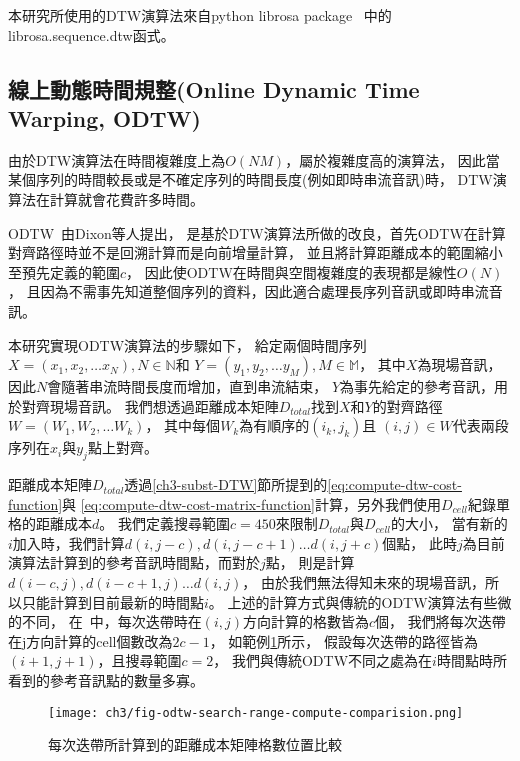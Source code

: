 \documentclass[class=NCU_thesis, crop=false]{standalone}
\begin{document}
本研究所使用的DTW演算法來自python librosa package~\cite{McFee2024librosa}
中的librosa.sequence.dtw函式。

\subsection{線上動態時間規整(Online Dynamic Time Warping, ODTW)} \label{ch3-subst-ODTW}
由於DTW演算法在時間複雜度上為$O(NM)$，屬於複雜度高的演算法，
因此當某個序列的時間較長或是不確定序列的時間長度(例如即時串流音訊)時，
DTW演算法在計算就會花費許多時間。

ODTW~\cite{dixon2005ODTW}由Dixon等人提出，
是基於DTW演算法所做的改良，首先ODTW在計算對齊路徑時並不是回溯計算而是向前增量計算，
並且將計算距離成本的範圍縮小至預先定義的範圍$c$，
因此使ODTW在時間與空間複雜度的表現都是線性$O(N)$，
且因為不需事先知道整個序列的資料，因此適合處理長序列音訊或即時串流音訊。

本研究實現ODTW演算法的步驟如下，
給定兩個時間序列
$X = (x_1, x_2, \dots x_N), N \in \mathbb{N}$和
$Y = (y_1, y_2, \dots y_M), M \in \mathbb{M}$，
其中$X$為現場音訊，因此$N$會隨著串流時間長度而增加，直到串流結束，
$Y$為事先給定的參考音訊，用於對齊現場音訊。
我們想透過距離成本矩陣$D_{total}$找到$X$和$Y$的對齊路徑$W = (W_1, W_2, \dots W_k)$，
其中每個$W_k$為有順序的$(i_k,j_k)$且
$(i,j) \in W$代表兩段序列在$x_i$與$y_j$點上對齊。

距離成本矩陣$D_{total}$透過\ref{ch3-subst-DTW}節所提到的\cref{eq:compute-dtw-cost-function}與
\cref{eq:compute-dtw-cost-matrix-function}計算，另外我們使用$D_{cell}$紀錄單格的距離成本$d$。
我們定義搜尋範圍$c=450$來限制$D_{total}$與$D_{cell}$的大小，
當有新的$i$加入時，我們計算$d(i, j-c), d(i, j-c+1) \dots d(i, j+c)$個點，
此時$j$為目前演算法計算到的參考音訊時間點，而對於$j$點，
則是計算$d(i-c, j), d(i-c+1, j) \dots d(i, j)$，
由於我們無法得知未來的現場音訊，所以只能計算到目前最新的時間點$i$。
上述的計算方式與傳統的ODTW演算法有些微的不同，
在~\cite{dixon2005ODTW}中，每次迭帶時在$(i, j)$方向計算的格數皆為$c$個，
我們將每次迭帶在j方向計算的cell個數改為$2c-1$，
如範例\cref{fig:fig-ch3-odtw-search-range-compute-comparision}所示，
假設每次迭帶的路徑皆為$(i+1, j+1)$，且搜尋範圍$c=2$，
我們與傳統ODTW不同之處為在$i$時間點時所看到的參考音訊點的數量多寡。
\begin{figure}[H]
    \centering
    \texttt{[image: ch3/fig-odtw-search-range-compute-comparision.png]}
    \caption{每次迭帶所計算到的距離成本矩陣格數位置比較}
    \label{fig:fig-ch3-odtw-search-range-compute-comparision}
\end{figure}
\end{document}
